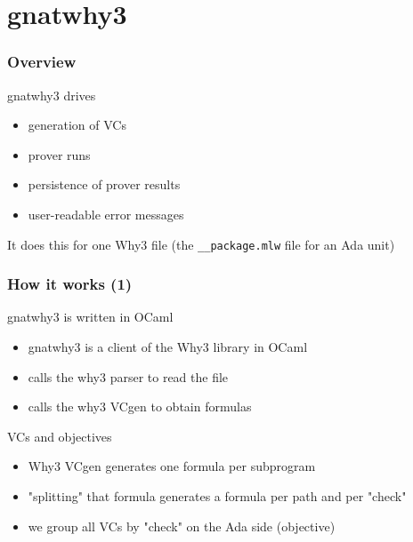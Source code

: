 \documentclass{beamer}
\newenvironment{specialframe}{%
  \begin{frame}[fragile,environment=specialframe]}{\end{frame}}
\begin{document}


\section{gnatwhy3}

\begin{specialframe}\frametitle{Overview}
   \begin{block}{gnatwhy3 drives}
      \begin{itemize}
      \item generation of VCs
      \item prover runs
      \item persistence of prover results
      \item user-readable error messages
      \end{itemize}
      It does this for one Why3 file (the \verb|__package.mlw| file for an Ada
      unit)
   \end{block}
\end{specialframe}

\begin{specialframe}\frametitle{How it works (1)}
   \begin{block}{gnatwhy3 is written in OCaml}
   \begin{itemize}
   \item gnatwhy3 is a client of the Why3 library in OCaml
   \item calls the why3 parser to read the file
   \item calls the why3 VCgen to obtain formulas
   \end{itemize}
   \end{block}

   \begin{block}{VCs and objectives}
   \begin{itemize}
   \item Why3 VCgen generates one formula per subprogram
   \item "splitting" that formula generates a formula per path and per "check"
   \item we group all VCs by "check" on the Ada side (objective)
   \end{itemize}
   \end{block}

\end{specialframe}
\end{document}
